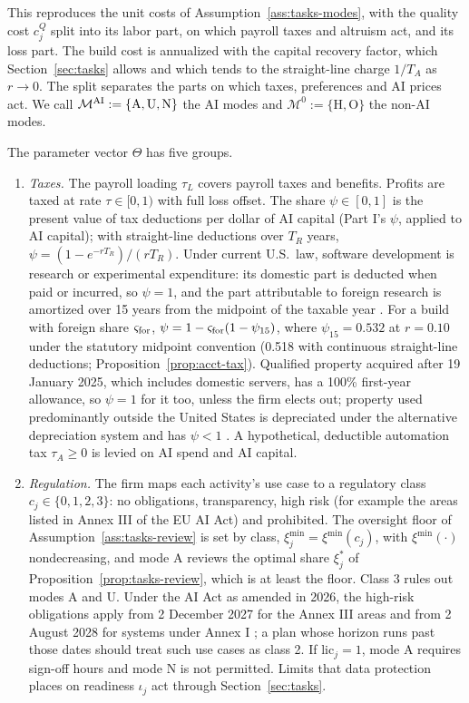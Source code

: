This reproduces the unit costs of Assumption~\ref{ass:tasks-modes}, with the quality cost $c^Q_j$ split into its labor part, on which payroll taxes and altruism act, and its loss part. The build cost is annualized with the capital recovery factor, which Section~\ref{sec:tasks} allows and which tends to the straight-line charge $1/T_A$ as $r\to0$. The split separates the parts on which taxes, preferences and AI prices act. We call $\mathcal M^{\rm AI}:=\{\mathrm A,\mathrm U,\mathrm N\}$ the AI modes and $\mathcal M^0:=\{\mathrm H,\mathrm O\}$ the non-AI modes.

\begin{assumption}\label{ass:ext-theta}
The parameter vector $\Theta$ has five groups.
\begin{enumerate}
\item[(i)] \emph{Taxes.} The payroll loading $\tau_L$ covers payroll taxes and benefits. Profits are taxed at rate $\tau\in[0,1)$ with full loss offset. The share $\psi\in[0,1]$ is the present value of tax deductions per dollar of AI capital (Part I's $\psi$, applied to AI capital); with straight-line deductions over $T_R$ years, $\psi=(1-e^{-rT_R})/(rT_R)$. Under current U.S.\ law, software development is research or experimental expenditure: its domestic part is deducted when paid or incurred, so $\psi=1$, and the part attributable to foreign research is amortized over 15 years from the midpoint of the taxable year \citep{usc2026sec174a,usc2026sec174}. For a build with foreign share $\varsigma_{\rm for}$, $\psi=1-\varsigma_{\rm for}(1-\psi_{15})$, where $\psi_{15}=0.532$ at $r=0.10$ under the statutory midpoint convention (0.518 with continuous straight-line deductions; Proposition~\ref{prop:acct-tax}). Qualified property acquired after 19 January 2025, which includes domestic servers, has a 100\% first-year allowance, so $\psi=1$ for it too, unless the firm elects out; property used predominantly outside the United States is depreciated under the alternative depreciation system and has $\psi<1$ \citep{irs2026notice202611,usc2026sec168}. A hypothetical, deductible automation tax $\tau_A\ge0$ is levied on AI spend and AI capital.
\item[(ii)] \emph{Regulation.} The firm maps each activity's use case to a regulatory class $c_j\in\{0,1,2,3\}$: no obligations, transparency, high risk (for example the areas listed in Annex III of the EU AI Act) and prohibited. The oversight floor of Assumption~\ref{ass:tasks-review} is set by class, $\xi^{\min}_j=\xi^{\min}(c_j)$, with $\xi^{\min}(\cdot)$ nondecreasing, and mode A reviews the optimal share $\xi^*_j$ of Proposition~\ref{prop:tasks-review}, which is at least the floor. Class 3 rules out modes A and U. Under the AI Act as amended in 2026, the high-risk obligations apply from 2 December 2027 for the Annex III areas and from 2 August 2028 for systems under Annex I \citep{eu2026regulation}; a plan whose horizon runs past those dates should treat such use cases as class 2. If $\mathrm{lic}_j=1$, mode A requires sign-off hours and mode N is not permitted. Limits that data protection places on readiness $\iota_j$ act through Section~\ref{sec:tasks}.

\end{enumerate}
\end{assumption}
